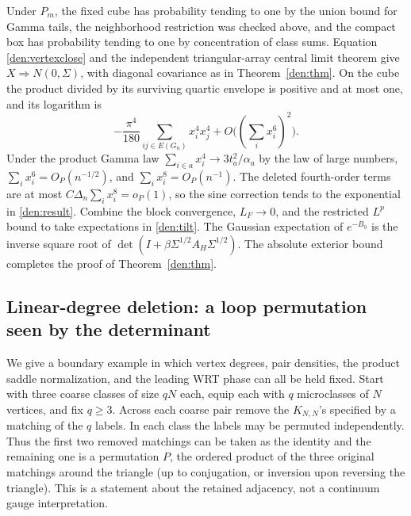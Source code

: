 Under \(P_m\), the fixed cube has probability tending to one by the union bound for Gamma tails, the neighborhood restriction was checked above, and the compact box has probability tending to one by concentration of class sums. Equation \eqref{den:vertexclose} and the independent triangular-array central limit theorem give \(X\Rightarrow N(0,\Sigma)\), with diagonal covariance as in Theorem~\ref{den:thm}. On the cube the product divided by its surviving quartic envelope is positive and at most one, and its logarithm is
\[
 -\frac{\pi^4}{180}\sum_{ij\in E(G_n)}x_i^4x_j^4
       +O\big((\sum_i x_i^6)^2\big).
\]
Under the product Gamma law \(\sum_{i\in a}x_i^4\to3t_a^2/\alpha_a\) by the law of large numbers, \(\sum_i x_i^6=O_P(n^{-1/2})\), and \(\sum_i x_i^8=O_P(n^{-1})\). The deleted fourth-order terms are at most \(C\Delta_n\sum_i x_i^8=o_P(1)\), so the sine correction tends to the exponential in \eqref{den:result}. Combine the block convergence, \(L_F\to0\), and the restricted \(L^p\) bound to take expectations in \eqref{den:tilt}. The Gaussian expectation of \(e^{-B_0}\) is the inverse square root of \(\det(I+\beta\Sigma^{1/2}A_H\Sigma^{1/2})\). The absolute exterior bound completes the proof of Theorem~\ref{den:thm}.

\subsection{Linear-degree deletion: a loop permutation seen by the determinant}

We give a boundary example in which vertex degrees, pair densities, the product saddle normalization, and the leading WRT phase can all be held fixed. Start with three coarse classes of size \(qN\) each, equip each with \(q\) microclasses of \(N\) vertices, and fix \(q\ge3\). Across each coarse pair remove the \(K_{N,N}\)'s specified by a matching of the \(q\) labels. In each class the labels may be permuted independently. Thus the first two removed matchings can be taken as the identity and the remaining one is a permutation \(P\), the ordered product of the three original matchings around the triangle (up to conjugation, or inversion upon reversing the triangle). This is a statement about the retained adjacency, not a continuum gauge interpretation.

